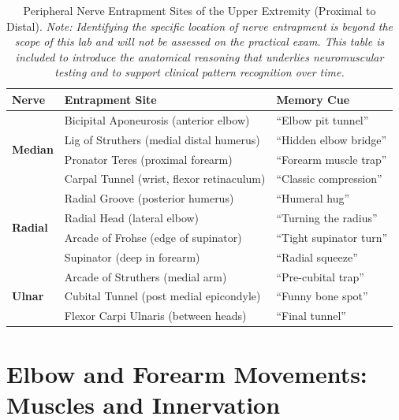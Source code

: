 \begin{table}[H]
\centering
\begin{tabular}{|p{2.8cm}|p{7cm}|p{4.7cm}|}
\hline
\textbf{Nerve} & \textbf{Entrapment Site} & \textbf{Memory Cue} \\
\hline
\multirow{4}{*}{\textbf{Median}} 
  & Bicipital Aponeurosis (anterior elbow) & “Elbow pit tunnel” \\
  & Lig of Struthers (medial distal humerus) & “Hidden elbow bridge” \\
  & Pronator Teres (proximal forearm) & “Forearm muscle trap” \\
  & Carpal Tunnel (wrist, flexor retinaculum) & “Classic compression” \\
\hline
\multirow{4}{*}{\textbf{Radial}} 
  & Radial Groove (posterior humerus) & “Humeral hug” \\
  & Radial Head (lateral elbow) & “Turning the radius” \\
  & Arcade of Frohse (edge of supinator) & “Tight supinator turn” \\
  & Supinator (deep in forearm) & “Radial squeeze” \\
\hline
\multirow{3}{*}{\textbf{Ulnar}} 
  & Arcade of Struthers (medial arm) & “Pre-cubital trap” \\
  & Cubital Tunnel (post medial epicondyle) & “Funny bone spot” \\
  & Flexor Carpi Ulnaris (between heads) & “Final tunnel” \\
\hline
\end{tabular}
\captionsetup{justification=raggedright, singlelinecheck=false}
\caption{Peripheral Nerve Entrapment Sites of the Upper Extremity (Proximal to Distal). \textit{Note: Identifying the specific location of nerve entrapment is beyond the scope of this lab and will not be assessed on the practical exam. This table is included to introduce the anatomical reasoning that underlies neuromuscular testing and to support clinical pattern recognition over time.}}
\end{table}

\section*{Elbow and Forearm Movements: Muscles and Innervation}

\vspace{.5cm}

